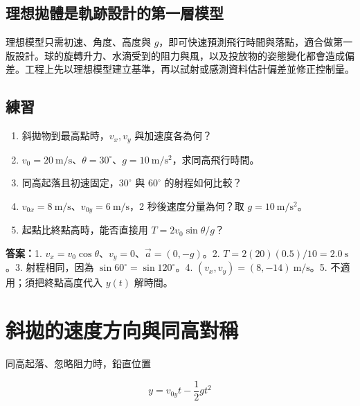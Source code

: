 \documentclass[11pt,a4paper]{article}
\providecommand{\tightlist}{%
  \setlength{\itemsep}{0pt}\setlength{\parskip}{0pt}}
\begin{document}
\subsection{理想拋體是軌跡設計的第一層模型}\label{ux7406ux60f3ux62cbux9ad4ux662fux8eccux8de1ux8a2dux8a08ux7684ux7b2cux4e00ux5c64ux6a21ux578b}

理想模型只需初速、角度、高度與 \(g\)，即可快速預測飛行時間與落點，適合做第一版設計。球的旋轉升力、水滴受到的阻力與風，以及投放物的姿態變化都會造成偏差。工程上先以理想模型建立基準，再以試射或感測資料估計偏差並修正控制量。

\begin{HandoutSelfCheck}

\subsection{練習}\label{ux7df4ux7fd2-4}

\begin{enumerate}
\def\labelenumi{\arabic{enumi}.}
\tightlist
\item
  斜拋物到最高點時，\(v_x,v_y\) 與加速度各為何？
\item
  \(v_0=20\ \mathrm{m/s}\)、\(\theta=30^\circ\)、\(g=10\ \mathrm{m/s^2}\)，求同高飛行時間。
\item
  同高起落且初速固定，\(30^\circ\) 與 \(60^\circ\) 的射程如何比較？
\item
  \(v_{0x}=8\ \mathrm{m/s}\)、\(v_{0y}=6\ \mathrm{m/s}\)，2 秒後速度分量為何？取 \(g=10\ \mathrm{m/s^2}\)。
\item
  起點比終點高時，能否直接用 \(T=2v_0\sin\theta/g\)？
\end{enumerate}

\textbf{答案：}1. \(v_x=v_0\cos\theta\)、\(v_y=0\)、\(\vec a=(0,-g)\)。2. \(T=2(20)(0.5)/10=2.0\ \mathrm s\)。3. 射程相同，因為 \(\sin60^\circ=\sin120^\circ\)。4. \((v_x,v_y)=(8,-14)\ \mathrm{m/s}\)。5. 不適用；須把終點高度代入 \(y(t)\) 解時間。

\end{HandoutSelfCheck}

\section{斜拋的速度方向與同高對稱}\label{ux659cux62cbux7684ux901fux5ea6ux65b9ux5411ux8207ux540cux9ad8ux5c0dux7a31}

同高起落、忽略阻力時，鉛直位置

\[
y=v_{0y}t-\frac12gt^2
\]
\end{document}
